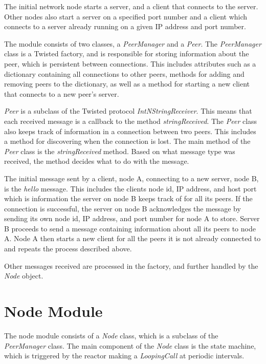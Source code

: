 The initial network node starts a server, and a client that connects to the server. Other nodes also start a server on a specified port number and a client which connects to a server already running on a given IP address and port number. 

The module consists of two classes, a \textit{PeerManager} and a \textit{Peer}. The \textit{PeerManager} class is a Twisted factory, and is responsible for storing information about the peer, which is persistent between connections. This includes attributes such as a dictionary containing all connections to other peers, methods for adding and removing peers to the dictionary, as well as a method for starting a new client that connects to a new peer's server.

\textit{Peer} is a subclass of the Twisted protocol \textit{IntNStringReceiver}. This means that each received message is a callback to the method \textit{stringReceived}. The \textit{Peer} class also keeps track of information in a connection between two peers. This includes a method for discovering when the connection is lost. The main method of the \textit{Peer} class is the \textit{stringReceived} method. Based on what message type was received, the method decides what to do with the message. 

The initial message sent by a client, node A, connecting to a new server, node B, is the \textit{hello} message. This includes the clients node id, IP address, and host port which is information the server on node B keeps track of for all its peers. If the connection is successful, the server on node B acknowledges the message by sending its own node id, IP address, and port number for node A to store. Server B proceeds to send a message containing information about all its peers to node A. Node A then starts a new client for all the peers it is not already connected to and repeats the process described above. 

Other messages received are processed in the factory, and further handled by the \textit{Node} object.


\section{Node Module}
The node module consists of a \textit{Node} class, which is a subclass of the \textit{PeerManager} class. The main component of the \textit{Node} class is the state machine, which is triggered by the reactor making a \textit{LoopingCall} at periodic intervals. 

